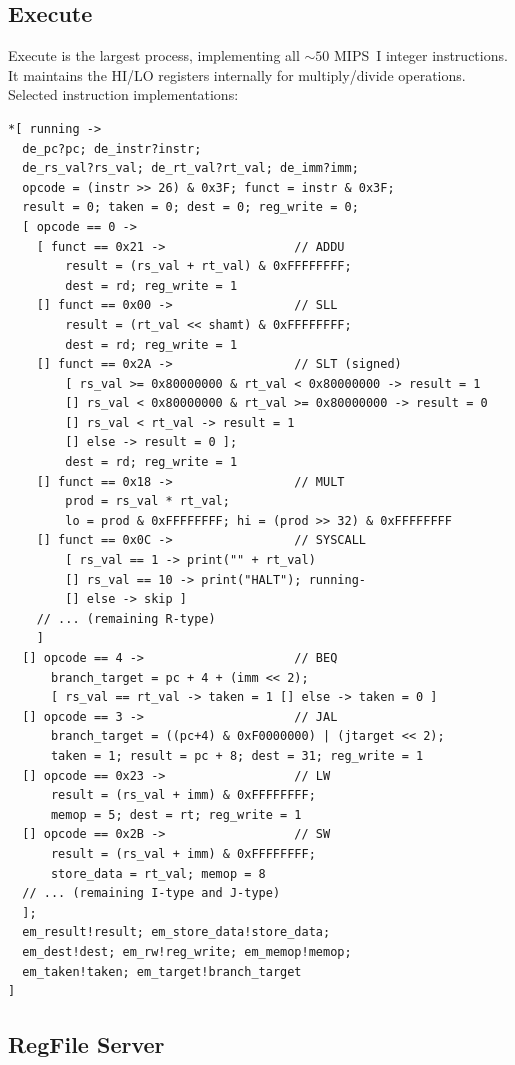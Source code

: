 \documentclass[11pt]{article}
\begin{document}
\subsection{Execute}

Execute is the largest process, implementing all ${\sim}50$ MIPS~I integer
instructions.  It maintains the HI/LO registers internally for
multiply/divide operations.  Selected instruction implementations:

\begin{lstlisting}[style=csp,caption={Execute process (selected instructions)}]
*[ running ->
  de_pc?pc; de_instr?instr;
  de_rs_val?rs_val; de_rt_val?rt_val; de_imm?imm;
  opcode = (instr >> 26) & 0x3F; funct = instr & 0x3F;
  result = 0; taken = 0; dest = 0; reg_write = 0;
  [ opcode == 0 ->
    [ funct == 0x21 ->                  // ADDU
        result = (rs_val + rt_val) & 0xFFFFFFFF;
        dest = rd; reg_write = 1
    [] funct == 0x00 ->                 // SLL
        result = (rt_val << shamt) & 0xFFFFFFFF;
        dest = rd; reg_write = 1
    [] funct == 0x2A ->                 // SLT (signed)
        [ rs_val >= 0x80000000 & rt_val < 0x80000000 -> result = 1
        [] rs_val < 0x80000000 & rt_val >= 0x80000000 -> result = 0
        [] rs_val < rt_val -> result = 1
        [] else -> result = 0 ];
        dest = rd; reg_write = 1
    [] funct == 0x18 ->                 // MULT
        prod = rs_val * rt_val;
        lo = prod & 0xFFFFFFFF; hi = (prod >> 32) & 0xFFFFFFFF
    [] funct == 0x0C ->                 // SYSCALL
        [ rs_val == 1 -> print("" + rt_val)
        [] rs_val == 10 -> print("HALT"); running-
        [] else -> skip ]
    // ... (remaining R-type)
    ]
  [] opcode == 4 ->                     // BEQ
      branch_target = pc + 4 + (imm << 2);
      [ rs_val == rt_val -> taken = 1 [] else -> taken = 0 ]
  [] opcode == 3 ->                     // JAL
      branch_target = ((pc+4) & 0xF0000000) | (jtarget << 2);
      taken = 1; result = pc + 8; dest = 31; reg_write = 1
  [] opcode == 0x23 ->                  // LW
      result = (rs_val + imm) & 0xFFFFFFFF;
      memop = 5; dest = rt; reg_write = 1
  [] opcode == 0x2B ->                  // SW
      result = (rs_val + imm) & 0xFFFFFFFF;
      store_data = rt_val; memop = 8
  // ... (remaining I-type and J-type)
  ];
  em_result!result; em_store_data!store_data;
  em_dest!dest; em_rw!reg_write; em_memop!memop;
  em_taken!taken; em_target!branch_target
]
\end{lstlisting}

\subsection{RegFile Server}
\end{document}
